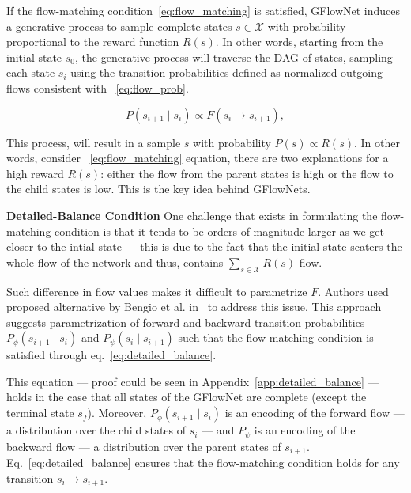 \documentclass{lxaiproposal}
\begin{document}
    If the flow-matching condition~\eqref{eq:flow_matching} is satisfied, GFlowNet induces a generative process to
    sample complete states $s \in \mathcal{X}$ with probability proportional to the reward function $R(s)$. In other
    words, starting from the initial state $s_0$, the generative process will traverse the DAG of states, sampling
    each state $s_i$ using the transition probabilities defined as normalized outgoing flows consistent with~
    \eqref{eq:flow_prob}.

    \begin{equation}
        P(s_{i+1} \mid s_i) \propto F(s_i \to s_{i+1}),
        \label{eq:flow_prob}
    \end{equation}

    This process, will result in a sample $s$ with probability $P(s) \propto R(s)$. In other words, consider~
    \eqref{eq:flow_matching} equation, there are two explanations for a high reward $R(s)$: either the flow from the parent
    states is high or the flow to the child states is low. This is the key idea behind GFlowNets.


    \textbf{Detailed-Balance Condition} One challenge that exists in formulating the flow-matching condition is that it
    tends to be orders of magnitude larger as we get closer to the intial state --- this is due to the fact that the
    initial state scaters the whole flow of the network and thus, contains $\sum_{s \in \mathcal{X}} R(s)$ flow.

    Such difference in flow values makes it difficult to parametrize $F$. Authors used proposed alternative by Bengio
    et al. in~\cite{bengio2023gflownetfoundations} to address this issue. This approach suggests parametrization of
    forward and backward transition probabilities $P_{\phi}(s_{i+1} \mid s_i)$ and $P_{\psi}(s_i \mid s_{i+1})$ such
    that the flow-matching condition is satisfied through eq.~\eqref{eq:detailed_balance}.

    This equation --- proof could be seen in Appendix~\ref{app:detailed_balance} --- holds in the case that all states of the GFlowNet are
    complete (except the terminal state $s_f$). Moreover, $P_{\phi}(s_{i+1} \mid s_i)$ is an encoding of the forward
    flow --- a distribution over the child states of $s_i$ --- and $P_{\psi}$ is an encoding of the backward flow --- a
    distribution over the parent states of $s_{i+1}$. Eq.~\eqref{eq:detailed_balance} ensures that the flow-matching
    condition holds for any transition $s_i \to s_{i+1}$.
\end{document}
